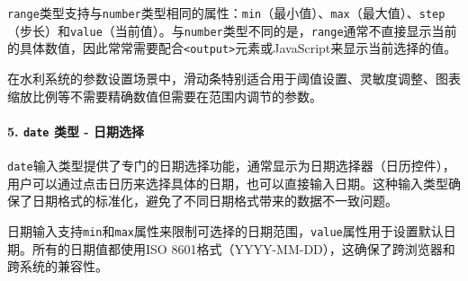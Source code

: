 \texttt{range}类型支持与\texttt{number}类型相同的属性：\texttt{min}（最小值）、\texttt{max}（最大值）、\texttt{step}（步长）和\texttt{value}（当前值）。与\texttt{number}类型不同的是，\texttt{range}通常不直接显示当前的具体数值，因此常常需要配合\texttt{\textless{}output\textgreater{}}元素或JavaScript来显示当前选择的值。

在水利系统的参数设置场景中，滑动条特别适合用于阈值设置、灵敏度调整、图表缩放比例等不需要精确数值但需要在范围内调节的参数。

\begin{Shaded}
\begin{Highlighting}[]
\DataTypeTok{\textless{}}\OperatorTok{=}\DataTypeTok{\textgreater{}}\DataTypeTok{\textless{}/}\DataTypeTok{\textgreater{}}
\DataTypeTok{\textless{}}\OperatorTok{=}\OtherTok{ }
\OperatorTok{=}\OtherTok{ }
\OperatorTok{=}\OtherTok{ }
\OperatorTok{=}\OtherTok{ }
\OperatorTok{=}\OtherTok{ }
\OperatorTok{=}\OtherTok{ }
\OperatorTok{=}
\OperatorTok{=}\DataTypeTok{\textgreater{}}
\DataTypeTok{\textless{}}\OperatorTok{=}\OperatorTok{=}\DataTypeTok{\textgreater{}}\DataTypeTok{\textless{}/}\DataTypeTok{\textgreater{}}
\end{Highlighting}
\end{Shaded}

\paragraph{\texorpdfstring{5. \texttt{date} 类型 - 日期选择}{5. date 类型 - 日期选择}}\label{date-ux7c7bux578b---ux65e5ux671fux9009ux62e9}

\texttt{date}输入类型提供了专门的日期选择功能，通常显示为日期选择器（日历控件），用户可以通过点击日历来选择具体的日期，也可以直接输入日期。这种输入类型确保了日期格式的标准化，避免了不同日期格式带来的数据不一致问题。

日期输入支持\texttt{min}和\texttt{max}属性来限制可选择的日期范围，\texttt{value}属性用于设置默认日期。所有的日期值都使用ISO 8601格式（YYYY-MM-DD），这确保了跨浏览器和跨系统的兼容性。

